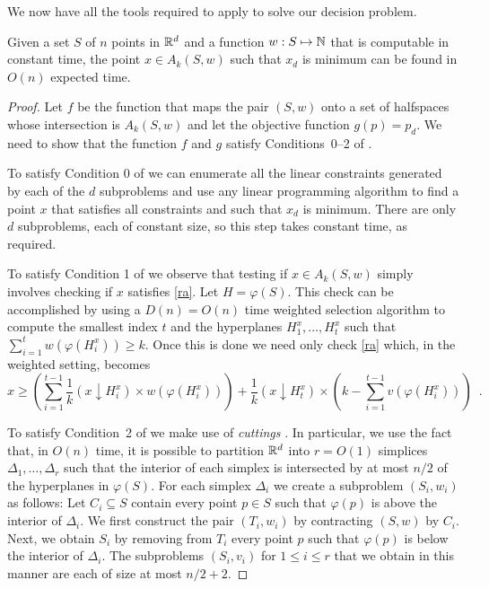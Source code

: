 \documentclass[lotsofwhite]{patmorin}
\newcommand{\drop}{\!\!\downarrow\!\!}
\newcommand{\dual}{\varphi}
\begin{document}
We now have all the tools required to apply  to solve our
decision problem.

\begin{thm}
Given a set $S$ of $n$ points in $\mathbb{R}^d$ and a 
function $w:S\mapsto\mathbb{N}$ that is computable in constant
time, the point $x\in A_k(S,w)$ such
that $x_d$ is minimum can be found in $O(n)$ expected
time.
\end{thm}

\begin{proof}
Let $f$ be the function that maps the pair $(S,w)$ onto a set of
halfspaces whose intersection is $A_k(S,w)$ and let the objective
function $g(p)=p_d$.  We need to show that the function $f$ and $g$
satisfy
Conditions~0--2 of .

To satisfy Condition 0 of  we can enumerate all the
linear constraints generated by each of the $d$ subproblems and use
any linear programming algorithm to find a point $x$ that satisfies
all constraints and such that $x_d$ is minimum.  There are only $d$
subproblems, each of constant size, so this step takes constant time,
as required.

To satisfy Condition 1 of  we observe that testing if
$x\in A_k(S,w)$ simply involves checking if $x$ satisfies \eqref{ra}.
Let $H=\dual(S)$.  This check can be accomplished by using a
$D(n)=O(n)$ time weighted selection algorithm
\cite[Exercise~9-2]{clrs01} to compute the smallest index $t$ and the
hyperplanes $H_{1}^x,\ldots,H_{t}^x$ such that
$\sum_{i=1}^tw(\dual(H_{i}^x)) \ge k$.  Once this is done we need only
check \eqref{ra} which, in the weighted setting, becomes 
\[
     x \ge \left(\sum_{i=1}^{t-1} \frac{1}{k}(x\drop
H_i^x)\times w(\dual(H_i^x))\right) 
   + \frac{1}{k}(x\drop H_t^x) \times \left(k-\sum_{i=1}^{t-1} v(\dual(H_{i}^x)) \right)
\enspace .
\]

To satisfy Condition~2 of  we make use of \emph{cuttings}
\cite[Section~4.7]{mat02}.  In particular, we use the fact that, in
$O(n)$ time, it is possible to partition $\mathbb{R}^d$ into $r=O(1)$
simplices $\Delta_1,\ldots,\Delta_r$ such that the interior of each
simplex is intersected by at most $n/2$ of the hyperplanes in
$\dual(S)$.  For each simplex $\Delta_i$ we create a subproblem
$(S_i,w_i)$ as follows: Let $C_i\subseteq S$ contain every point $p\in
S$ such that $\dual(p)$ is above the interior of $\Delta_i$.  We first
construct the pair $(T_i,w_i)$ by contracting $(S,w)$ by $C_i$.  Next,
we obtain $S_i$ by removing from $T_i$ every point $p$ such that
$\dual(p)$ is below the interior of $\Delta_i$.  The subproblems
$(S_i,v_i)$ for $1\le i\le r$ that we obtain in this manner are each
of size at most $n/2+2$.


\end{proof}
\end{document}

